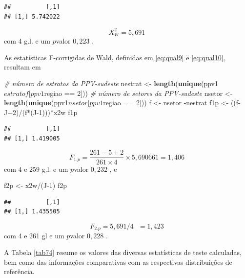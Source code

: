 \documentclass[]{book}
\newenvironment{Shaded}{\begin{snugshade}}{\end{snugshade}}
\newcommand{\KeywordTok}[1]{\textcolor[rgb]{0.13,0.29,0.53}{\textbf{{#1}}}}
\newcommand{\DecValTok}[1]{\textcolor[rgb]{0.00,0.00,0.81}{{#1}}}
\newcommand{\StringTok}[1]{\textcolor[rgb]{0.31,0.60,0.02}{{#1}}}
\newcommand{\CommentTok}[1]{\textcolor[rgb]{0.56,0.35,0.01}{\textit{{#1}}}}
\newcommand{\NormalTok}[1]{{#1}}
\numberwithin{example}{chapter}
\numberwithin{remark}{chapter}
\numberwithin{definition}{chapter}
\begin{document}
\begin{verbatim}
##          [,1]
## [1,] 5.742022
\end{verbatim}

\[
X_{W}^{2}=5,691 
\] com \(4\) g.l. e um \(p\)valor \(0,223\) .

As estatísticas F-corrigidas de Wald, definidas em \eqref{eq:qual9} e
\eqref{eq:qual10}, resultam em

\begin{Shaded}
\begin{Highlighting}[]
\CommentTok{# número de estratos da PPV-sudeste}
\NormalTok{nestrat <-}\StringTok{ }\KeywordTok{length}\NormalTok{(}\KeywordTok{unique}\NormalTok{(ppv1$estratof[ppv1$regiao ==}\StringTok{ }\DecValTok{2}\NormalTok{]))}
\CommentTok{# número de setores da PPV-sudeste}
\NormalTok{nsetor <-}\StringTok{ }\KeywordTok{length}\NormalTok{(}\KeywordTok{unique}\NormalTok{(ppv1$nsetor[ppv1$regiao ==}\StringTok{ }\DecValTok{2}\NormalTok{]))}
\NormalTok{f <-}\StringTok{ }\NormalTok{nsetor -nestrat}
\NormalTok{f1p <-}\StringTok{ }\NormalTok{((f-J}\DecValTok{+2}\NormalTok{)/(f*(J}\DecValTok{-1}\NormalTok{)))*x2w}
\NormalTok{f1p}
\end{Highlighting}
\end{Shaded}

\begin{verbatim}
##          [,1]
## [1,] 1.419005
\end{verbatim}

\[
F_{1.p}=\frac{261-5+2}{261\times 4}\times 5,690661=1,406 
\] com \(4\) e \(259\) g.l. e um \(p\)valor \(0,232\) , e

\begin{Shaded}
\begin{Highlighting}[]
\NormalTok{f2p <-}\StringTok{ }\NormalTok{x2w/(J}\DecValTok{-1}\NormalTok{)}
\NormalTok{f2p}
\end{Highlighting}
\end{Shaded}

\begin{verbatim}
##          [,1]
## [1,] 1.435505
\end{verbatim}

\[
F_{2.p}=5,691/4\mbox{ }=1,423 
\] com 4 e 261 gl e um \(p\)valor \(0,228\) .

A Tabela \ref{tab74} resume os valores das diversas estatísticas de
teste calculadas, bem como das informações comparativas com as
respectivas distribuições de referência.
\end{document}
